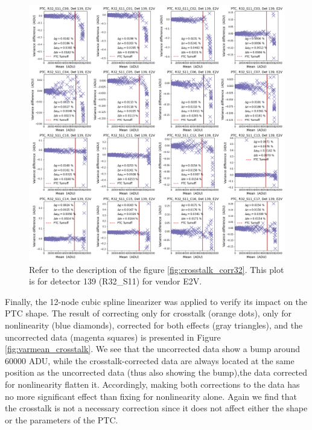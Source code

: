 \begin{figure}[!htb]
    \centering
    \includegraphics[width=\textwidth]{Figures/ptc_crosstalk139.png}
    \caption{Refer to the description of the figure \ref{fig:crosstalk_corr32}. This plot is for detector 139 (R32\_S11) for vendor E2V.}
    \label{fig:crosstalk_corr139}
\end{figure}

Finally, the 12-node cubic spline linearizer was applied to verify its impact on the PTC shape. The result of correcting only for crosstalk (orange dots), only for nonlinearity (blue diamonds), corrected for both effects (gray triangles), and the uncorrected data (magenta squares) is presented in Figure \ref{fig:varmean_crosstalk}. We see that the uncorrected data show a bump around 60000 ADU, while the crosstalk-corrected data are always located at the same position as the uncorrected data (thus also showing the bump),the data corrected for nonlinearity flatten it. Accordingly, making both corrections to the data has no more significant effect than fixing for nonlinearity alone. Again we find that the crosstalk is not a necessary correction since it does not affect either the shape or the parameters of the PTC. 

